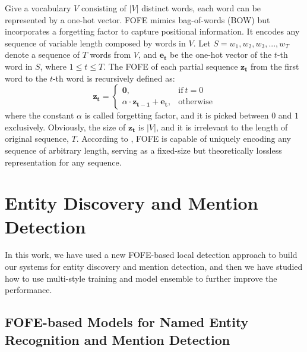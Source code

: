 \documentclass[11pt]{article}
\begin{document}
Give a vocabulary $V$ consisting of $|V|$ distinct words, each word can be represented by a one-hot vector. 
FOFE mimics bag-of-words (BOW) but incorporates a forgetting factor to capture positional information.
It encodes any sequence of variable length composed by words in $V$. 
Let $S = {w_1, w_2, w_3, ... , w_T}$ denote a sequence of $T$ words from $V$, 
and $\bm{e_t}$ be the one-hot vector of the $t$-th word in $S$, where $1 \leq t \leq T$.
The FOFE of each partial sequence $\bm{z_t}$ from the first word to the $t$-th word is recursively defined as:
\begin{equation}
\bm{z_t}=
\begin{cases}
\bm{0}, & \text{if}\ t = 0 \\
\alpha \cdot \bm{z_{t - 1}} + \bm{e_t}, & \text{otherwise}
\end{cases}  \label{eq_FOFE_formula}
\end{equation}
where the constant $\alpha$ is called forgetting factor, and it is picked between $0$ and $1$ exclusively. 
Obviously, the size of $\bm{z_t}$ is $|V|$, and it is irrelevant to the length of original sequence, $T$.
According to \cite{zhang2015fixed}, FOFE is capable of uniquely encoding any sequence of arbitrary length, serving as a fixed-size but theoretically lossless representation for any sequence.

\section{Entity Discovery and Mention Detection}

In this work, we have used a new FOFE-based local detection approach to build our systems for 
entity discovery and mention detection, and then we have studied how to use multi-style training and model ensemble to further improve the performance. 

\subsection{FOFE-based Models for Named Entity Recognition and Mention Detection}
\end{document}
